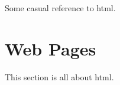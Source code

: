 \documentclass[12pt]{article}
\begin{document}
\begin{abstract}
 This abstract mentions \gls{html}.
 \end{abstract}
 Some casual reference to \gls{html}.
 \section{Web Pages}
 This section is all about \gls{html}. 
\end{document}
